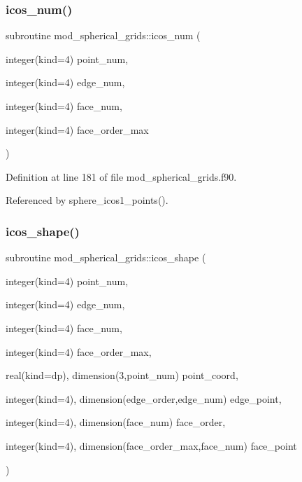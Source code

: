 \subsubsection{\texorpdfstring{icos\+\_\+num()}{icos\_num()}}
{\footnotesize\ttfamily subroutine mod\+\_\+spherical\+\_\+grids\+::icos\+\_\+num (\begin{DoxyParamCaption}\item[{integer(kind=4)}]{point\+\_\+num,  }\item[{integer(kind=4)}]{edge\+\_\+num,  }\item[{integer(kind=4)}]{face\+\_\+num,  }\item[{integer(kind=4)}]{face\+\_\+order\+\_\+max }\end{DoxyParamCaption})}



Definition at line 181 of file mod\+\_\+spherical\+\_\+grids.\+f90.



Referenced by sphere\+\_\+icos1\+\_\+points().

\mbox{\label{namespacemod__spherical__grids_ac770a39945e60a262069f9f186819614}} 
\subsubsection{\texorpdfstring{icos\+\_\+shape()}{icos\_shape()}}
{\footnotesize\ttfamily subroutine mod\+\_\+spherical\+\_\+grids\+::icos\+\_\+shape (\begin{DoxyParamCaption}\item[{integer(kind=4)}]{point\+\_\+num,  }\item[{integer(kind=4)}]{edge\+\_\+num,  }\item[{integer(kind=4)}]{face\+\_\+num,  }\item[{integer(kind=4)}]{face\+\_\+order\+\_\+max,  }\item[{real(kind=dp), dimension(3,point\+\_\+num)}]{point\+\_\+coord,  }\item[{integer(kind=4), dimension(edge\+\_\+order,edge\+\_\+num)}]{edge\+\_\+point,  }\item[{integer(kind=4), dimension(face\+\_\+num)}]{face\+\_\+order,  }\item[{integer(kind=4), dimension(face\+\_\+order\+\_\+max,face\+\_\+num)}]{face\+\_\+point }\end{DoxyParamCaption})}



